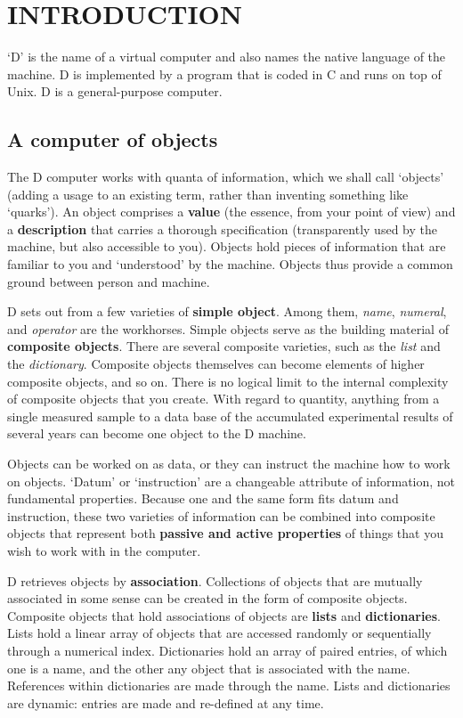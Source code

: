 
\chapter{INTRODUCTION}

`D' is the name of a virtual computer and also names the native language of the machine. D is implemented by a program that is coded in C and runs on top of Unix. D is a general-purpose computer.

\section{A computer of objects}

The  D computer works with quanta of information,  which we  shall  call `objects'  (adding  a usage to an existing term,  rather  than  inventing something like `quarks').  An object comprises a \textbf{value} (the essence, from your   point  of  view)  and  a  \textbf{description}  that  carries  a   thorough specification (transparently used by the machine,  but also accessible to you).  Objects hold pieces of information that are familiar to you and `understood' by the machine. Objects thus provide  a common ground between person and machine.

D  sets out from a few varieties of \textbf{simple  object}.  Among  them,  \emph{name}, \emph{numeral},  and \emph{operator} are the workhorses.  Simple objects serve as  the building  material  of \textbf{composite objects}.  There  are  several  composite varieties,  such as the \emph{list} and  the  \emph{dictionary}. Composite objects themselves can become elements of higher composite objects, and so on.  There  is no logical limit to the internal complexity  of  composite objects that you create.  With regard to quantity, anything from a single measured sample to a data base of the accumulated experimental results of several years can become one object to the D machine.

Objects can be worked on as data, or they can instruct the machine how to work on objects. `Datum' or `instruction' are a changeable attribute of information,  not fundamental  properties. Because  one  and the same form fits datum  and  instruction,  these  two varieties of information can be combined into composite objects that represent  both \textbf{passive and active properties} of things that you wish  to work with in the computer.

D  retrieves  objects by \textbf{association}.  Collections of objects  that  are mutually associated in some sense can be created in the form of composite objects.  Composite  objects that hold associations of objects are  \textbf{lists} and  \textbf{dictionaries}.  Lists  hold  a linear array of objects  that  are  accessed randomly or sequentially through a numerical index.  Dictionaries hold an array of paired entries, of which one is a name, and the other any object that is associated with the name.  References within  dictionaries are made through the name.  Lists and dictionaries are dynamic:  entries are  made and re-defined at any time.


